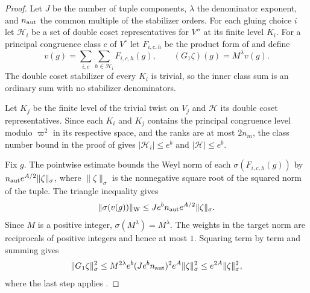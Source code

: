 \begin{proof}
Let $J$ be the number of tuple components, $\lambda$ the denominator exponent, and $n_{\rm aut}$ the common multiple of the stabilizer orders. For each gluing choice $i$ let $\mathcal H_i$ be a set of double coset representatives for $V''$ at its finite level $K_i$. For a principal congruence class $c$ of $V^\circ$ let $F_{i,c,h}$ be the product form of  and define
\[
 v(g)=\sum_{i,c}\sum_{h\in\mathcal H_i}F_{i,c,h}(g),
 \qquad
 (G_1\zeta)(g)=M^\lambda v(g).
\]
The double coset stabilizer of every $K_i$ is trivial, so the inner class sum is an ordinary sum with no stabilizer denominators.

Let $K_j$ be the finite level of the trivial twist on $V_j$ and $\mathcal H$ its double coset representatives. Since each $K_i$ and $K_j$ contains the principal congruence level modulo $\varpi^2$ in its respective space, and the ranks are at most $2n_m$, the class number bound in the proof of  gives $|\mathcal H_i|\le e^b$ and $|\mathcal H|\le e^b$.

Fix $g$. The pointwise estimate bounds the Weyl norm of each $\sigma(F_{i,c,h}(g))$ by $n_{\rm aut} e^{A/2}\|\zeta\|_\sigma$, where $\|\zeta\|_\sigma$ is the nonnegative square root of the squared norm of the tuple. The triangle inequality gives
\[
 \|\sigma(v(g))\|_{\rm W}
 \le J e^b n_{\rm aut} e^{A/2}\|\zeta\|_\sigma .
\]
Since $M$ is a positive integer, $\sigma(M^\lambda)=M^\lambda$. The weights in the target norm are reciprocals of positive integers and hence at most $1$. Squaring term by term and summing gives
\[
 \|G_1\zeta\|_\sigma^2
 \le M^{2\lambda}e^b(J e^b n_{\rm aut})^2 e^A\|\zeta\|_\sigma^2
 \le e^{2A}\|\zeta\|_\sigma^2,
\]
where the last step applies .
\end{proof}

